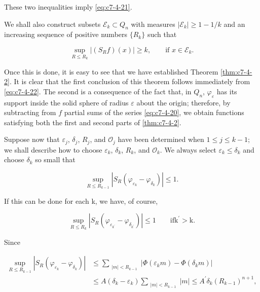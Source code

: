 These two inequalities imply \eqref{eq:c7-4-21}.

We shall also construct subsets $\mathcal{E}_k \subset Q_n$ with measures $|\mathcal{E}_k| \geq 1 - 1/k$ and an increasing sequence of positive numbers $\{R_k\}$ such that

\begin{equation}\label{eq:c7-4-22}
\sup_{R\leq R_{k}}\left|(S_{R}f)(x)\right|\geq k,\qquad\text{if }x\in\mathcal{E}_{k}.
\end{equation}

Once this is done, it is easy to see that we have established Theorem \ref{thm:c7-4-2}. It is clear that the first conclusion of this theorem follows immediately from \eqref{eq:c7-4-22}. The second is a consequence of the fact that, in $Q_n$, $\varphi_\varepsilon$ has its support inside the solid sphere of radius $\varepsilon$ about the origin; therefore, by subtracting from $f$ partial sums of the series \eqref{eq:c7-4-20}, we obtain functions satisfying both the first and second parts of \eqref{thm:c7-4-2}.

Suppose now that $\varepsilon_j$, $\delta_j$, $R_j$, and $\mathcal{O}_j$ have been determined when $1 \leq j \leq k - 1$; we shall describe how to choose $\varepsilon_k$, $\delta_k$, $R_k$, and $\mathcal{O}_k$. We always select $\varepsilon_k \leq \delta_k$ and choose $\delta_k$ so small that

\begin{equation}\label{eq:c7-4-23}
\sup_{R\leq R_{k-1}}\left|S_{R}(\varphi_{\varepsilon_{k}}-\varphi_{\delta_{k}})\right|\leq1.
\end{equation}

If this can be done for each k, we have, of course,

\begin{equation}
\tag{4.23$'$}\label{eq:c7-4-23p}
\sup_{R\leq R_{k}}|S_{R}(\varphi_{\varepsilon_{k^{\prime}}}-\varphi_{\delta_{k^{\prime}}})|\leq1\qquad\mathrm{i f k^{\prime}>k.}
\end{equation}

Since

\[
\begin{aligned}{\sup_{R\leq R_{k-1}}\left|S_{R}(\varphi_{\varepsilon_{k}}-\varphi_{\delta_{k}})\right|}&{{}\leq\sum_{\substack{|m|<R_{k-1}}}|\Phi(\varepsilon_{k}m)-\Phi(\delta_{k}m)|}\\ {}&{{}\leq A(\delta_{k}-\varepsilon_{k})\sum_{\substack{|m|<R_{k-1}}}|m|\leq A^{\prime}\delta_{k}(R_{k-1})^{n+1},}\\ \end{aligned}
\]

